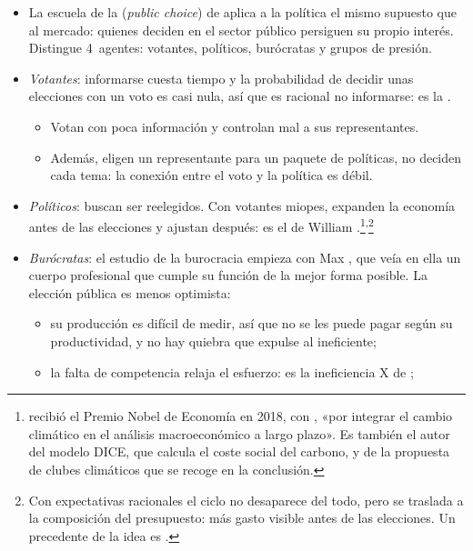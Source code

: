 \documentclass[11pt]{article}
\begin{document}
\begin{itemize}
\begin{itemize}
  \end{itemize}
\item La escuela de la  (\emph{public choice}) de \textcite{BuchananTullock1962Calculus} aplica a la política el mismo supuesto que al mercado: quienes deciden en el sector público persiguen su propio interés. Distingue 4~agentes: votantes, políticos, burócratas y grupos de presión.
\item \emph{Votantes}: informarse cuesta tiempo y la probabilidad de decidir unas elecciones con un voto es casi nula, así que es racional no informarse: es la \nocite{Downs1957Economic}.
  \begin{itemize}
  \item Votan con poca información y controlan mal a sus representantes.
  \item Además, eligen un representante para un paquete de políticas, no deciden cada tema: la conexión entre el voto y la política es débil.
  \end{itemize}
\item \emph{Políticos}: buscan ser reelegidos. Con votantes miopes, expanden la economía antes de las elecciones y ajustan después: es el  de William \textcite{Nordhaus1975Political}.\footnote{ recibió el Premio Nobel de Economía en 2018, con , «por integrar el cambio climático en el análisis macroeconómico a largo plazo»\nocite{Nobel2018Nordhaus}. Es también el autor del modelo DICE, que calcula el coste social del carbono, y de la propuesta de clubes climáticos que se recoge en la conclusión.}\textsuperscript{,}\footnote{Con expectativas racionales el ciclo no desaparece del todo, pero se traslada a la composición del presupuesto: más gasto visible antes de las elecciones\nocite{Rogoff1990Equilibrium}. Un precedente de la idea es \textcite{Kalecki1943Political}.}
\item \emph{Burócratas}: el estudio de la burocracia empieza con Max \textcite{Weber1922Wirtschaft}, que veía en ella un cuerpo profesional que cumple su función de la mejor forma posible. La elección pública es menos optimista:
  \begin{itemize}
  \item su producción es difícil de medir, así que no se les puede pagar según su productividad, y no hay quiebra que expulse al ineficiente;
  \item la falta de competencia relaja el esfuerzo: es la ineficiencia X de \textcite{Leibenstein1966Allocative} ;

\end{itemize}
\end{itemize}
\end{document}
